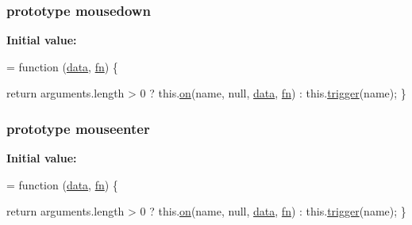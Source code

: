 \subsubsection[{\texorpdfstring{mousedown}{mousedown}}]{ {\bf prototype} mousedown}\hypertarget{jquery-2_82_81-vsdoc_8js_ad995651a26de4e6b051bbbeff5591c79}{}\label{jquery-2_82_81-vsdoc_8js_ad995651a26de4e6b051bbbeff5591c79}
{\bfseries Initial value\+:}
\begin{DoxyCode}
= \textcolor{keyword}{function} (\hyperlink{jquery-2_82_81-vsdoc_8js_a609407b3456fdc3c5671a9fc4a226ff7}{data}, \hyperlink{jquery-2_82_81-vsdoc_8js_acef6bdaf6b9b20fdcca1ea86f0902c3b}{fn}) \{
        

        \textcolor{keywordflow}{return} arguments.length > 0 ?
            this.\hyperlink{jquery-2_82_81-vsdoc_8js_ae453b412b883f60220d73468ef6c6dbc}{on}(name, null, \hyperlink{jquery-2_82_81-vsdoc_8js_a609407b3456fdc3c5671a9fc4a226ff7}{data}, \hyperlink{jquery-2_82_81-vsdoc_8js_acef6bdaf6b9b20fdcca1ea86f0902c3b}{fn}) :
            this.\hyperlink{jquery-2_82_81-vsdoc_8js_a2388c4114d5e3e4eab020f973641519c}{trigger}(name);
    \}
\end{DoxyCode}
\subsubsection[{\texorpdfstring{mouseenter}{mouseenter}}]{ {\bf prototype} mouseenter}\hypertarget{jquery-2_82_81-vsdoc_8js_a762f67ea0a9dd89f27dbe2b23d9f91b9}{}\label{jquery-2_82_81-vsdoc_8js_a762f67ea0a9dd89f27dbe2b23d9f91b9}
{\bfseries Initial value\+:}
\begin{DoxyCode}
= \textcolor{keyword}{function} (\hyperlink{jquery-2_82_81-vsdoc_8js_a609407b3456fdc3c5671a9fc4a226ff7}{data}, \hyperlink{jquery-2_82_81-vsdoc_8js_acef6bdaf6b9b20fdcca1ea86f0902c3b}{fn}) \{
        

        \textcolor{keywordflow}{return} arguments.length > 0 ?
            this.\hyperlink{jquery-2_82_81-vsdoc_8js_ae453b412b883f60220d73468ef6c6dbc}{on}(name, null, \hyperlink{jquery-2_82_81-vsdoc_8js_a609407b3456fdc3c5671a9fc4a226ff7}{data}, \hyperlink{jquery-2_82_81-vsdoc_8js_acef6bdaf6b9b20fdcca1ea86f0902c3b}{fn}) :
            this.\hyperlink{jquery-2_82_81-vsdoc_8js_a2388c4114d5e3e4eab020f973641519c}{trigger}(name);
    \}
\end{DoxyCode}

